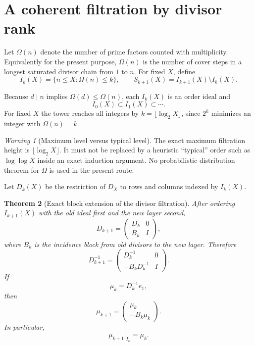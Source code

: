 \documentclass[11pt]{amsart}
\numberwithin{equation}{section}
\theoremstyle{plain}
\newtheorem{theorem}{Theorem}[section]
\theoremstyle{definition}
\theoremstyle{remark}
\newtheorem{warning}[theorem]{Warning}
\begin{document}
\section{A coherent filtration by divisor rank}
\label{sec:omega_filtration}

Let $\Omega(n)$ denote the number of prime factors counted with multiplicity.  Equivalently for
the present purpose, $\Omega(n)$ is the number of cover steps in a longest saturated divisor
chain from $1$ to $n$.  For fixed $X$, define
\begin{equation}
I_k(X)=
\{n\le X:\Omega(n)\le k\},
\qquad
S_{k+1}(X)=I_{k+1}(X)\setminus I_k(X).
\label{eq:Ik_Sk}
\end{equation}

Because $d\mid n$ implies $\Omega(d)\le\Omega(n)$, each $I_k(X)$ is an order ideal and
\[
I_0(X)\subset I_1(X)\subset\cdots.
\]
For fixed $X$ the tower reaches all integers by
$k=\lfloor\log_2X\rfloor$, since $2^k$ minimizes an integer with $\Omega(n)=k$.

\begin{warning}[Maximum level versus typical level]
\label{warn:omega_max_typical}
The exact maximum filtration height is $\lfloor\log_2X\rfloor$.  It must not be replaced by a
heuristic ``typical'' order such as $\log\log X$ inside an exact induction argument.  No
probabilistic distribution theorem for $\Omega$ is used in the present route.
\end{warning}

Let $D_k(X)$ be the restriction of $D_X$ to rows and columns indexed by $I_k(X)$.

\begin{theorem}[Exact block extension of the divisor filtration]
\label{thm:block_divisor_extension}
After ordering $I_{k+1}(X)$ with the old ideal first and the new layer second,
\begin{equation}
D_{k+1}
=
\begin{pmatrix}
D_k&0\\
B_k&I
\end{pmatrix},
\label{eq:D_block_extension}
\end{equation}
where $B_k$ is the incidence block from old divisors to the new layer.  Therefore
\begin{equation}
D_{k+1}^{-1}
=
\begin{pmatrix}
D_k^{-1}&0\\
-B_kD_k^{-1}&I
\end{pmatrix}.
\label{eq:Dinv_block_extension}
\end{equation}
If
\[
\mu_k=D_k^{-1}e_1,
\]
then
\begin{equation}
\boxed{
\mu_{k+1}
=
\begin{pmatrix}
\mu_k\\
-B_k\mu_k
\end{pmatrix}.
}
\label{eq:mu_layer_extension}
\end{equation}
In particular,
\begin{equation}
\mu_{k+1}|_{I_k}=\mu_k.
\label{eq:coherent_restriction}
\end{equation}
\end{theorem}
\end{document}

